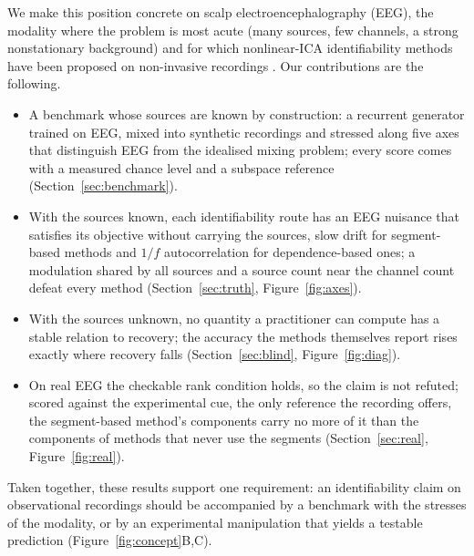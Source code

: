 We make this position concrete on scalp electroencephalography (EEG), the modality where the problem is most acute (many sources, few channels, a strong nonstationary background) and for which nonlinear-ICA identifiability methods have been proposed on non-invasive recordings \citep{hyvarinen2016tcl,halva2021snica}.
Our contributions are the following.
\begin{itemize}\setlength{\itemsep}{1pt}
  \item A benchmark whose sources are known by construction: a recurrent generator trained on EEG, mixed into synthetic recordings and stressed along five axes that distinguish EEG from the idealised mixing problem; every score comes with a measured chance level and a subspace reference (Section~\ref{sec:benchmark}).
  \item With the sources known, each identifiability route has an EEG nuisance that satisfies its objective without carrying the sources, slow drift for segment-based methods and $1/f$ autocorrelation for dependence-based ones; a modulation shared by all sources and a source count near the channel count defeat every method (Section~\ref{sec:truth}, Figure~\ref{fig:axes}).
  \item With the sources unknown, no quantity a practitioner can compute has a stable relation to recovery; the accuracy the methods themselves report rises exactly where recovery falls (Section~\ref{sec:blind}, Figure~\ref{fig:diag}).
  \item On real EEG the checkable rank condition holds, so the claim is not refuted; scored against the experimental cue, the only reference the recording offers, the segment-based method's components carry no more of it than the components of methods that never use the segments (Section~\ref{sec:real}, Figure~\ref{fig:real}).
\end{itemize}
Taken together, these results support one requirement: an identifiability claim on observational recordings should be accompanied by a benchmark with the stresses of the modality, or by an experimental manipulation that yields a testable prediction (Figure~\ref{fig:concept}B,C).
